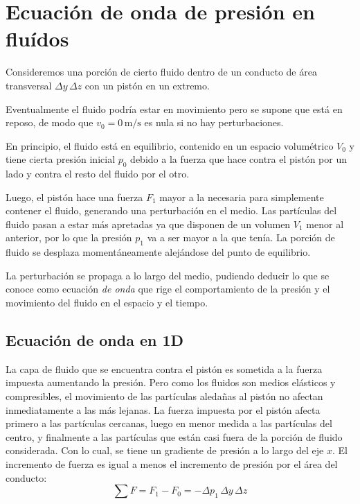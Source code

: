 \documentclass[a5paper,12pt,twoside]{book}
\begin{document}


\section{Ecuación de onda de presión en fluídos}

Consideremos una porción de cierto fluido dentro de un conducto de área transversal $\Delta y \, \Delta z$ con un pistón en un extremo.

\begin{center}
    \def\svgwidth{0.8\linewidth}
    
\end{center}

Eventualmente el fluido podría estar en movimiento pero se supone que está en reposo, de modo que $v_0=0\,\si{\metre\per\second}$ es nula si no hay perturbaciones.

En principio, el fluido está en equilibrio, contenido en un espacio volumétrico $V_0$ y tiene cierta presión inicial $p_0$ debido a la fuerza que hace contra el pistón por un lado y contra el resto del fluido por el otro.

Luego, el pistón hace una fuerza $F_1$ mayor a la necesaria para simplemente contener el fluido, generando una perturbación en el medio.
Las partículas del fluido pasan a estar más apretadas ya que disponen de un volumen $V_1$ menor al anterior, por lo que la presión $p_1$ va a ser mayor a la que tenía.
La porción de fluido se desplaza momentáneamente alejándose del punto de equilibrio.

La perturbación se propaga a lo largo del medio, pudiendo deducir lo que se conoce como ecuación \emph{de onda} que rige el comportamiento de la presión y el movimiento del fluido en el espacio y el tiempo.

\subsection{Ecuación de onda en 1D}

La capa de fluido que se encuentra contra el pistón es sometida a la fuerza impuesta aumentando la presión.
Pero como los fluidos son medios elásticos y compresibles, el movimiento de las partículas aledañas al pistón no afectan inmediatamente a las más lejanas.
La fuerza impuesta por el pistón afecta primero a las partículas cercanas, luego en menor medida a las partículas del centro, y finalmente a las partículas que están casi fuera de la porción de fluido considerada.
Con lo cual, se tiene un gradiente de presión a lo largo del eje $x$.
El incremento de fuerza es igual a menos el incremento de presión por el área del conducto:
\begin{equation*}
    \sum F = F_1 - F_0 = - \Delta p_1 \, \Delta y \, \Delta z
\end{equation*}
\end{document}
